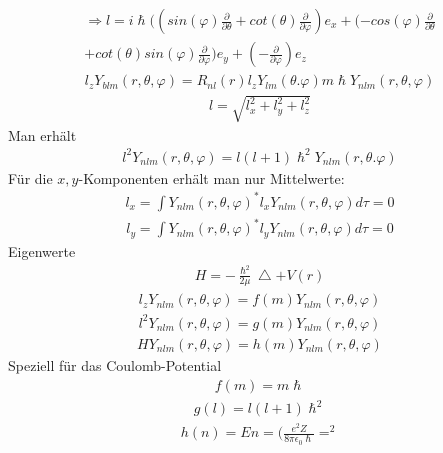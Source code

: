 \documentclass[10pt,a4paper]{article}
\begin{document}
\begin{align}
\Rightarrow l=i\hslash ((sin(\varphi) \frac{\partial}{\partial \theta}+cot(\theta)\frac{\partial}{\partial \varphi})e_x+(-cos(\varphi) \frac{\partial}{\partial \theta} \\ +cot(\theta)sin(\varphi) \frac{\partial}{\partial \varphi})e_y +(-\frac{\partial}{\partial \varphi})e_z
\end{align}
\begin{align}
l_zY_{blm}(r,\theta,\varphi)=R_{nl}(r)l_z Y_{lm}(\theta. \varphi)m \hslash Y_{nlm} (r,\theta,\varphi)
\end{align}
\begin{align}
l=\sqrt{l_x^2+l_y^2+l_z^2}
\end{align}
Man erhält
\begin{align}
l^2 Y_{nlm}(r,\theta,\varphi)=l(l+1) \hslash^2 Y_{nlm}(r,\theta.\varphi)
\end{align}
Für die $x,y$-Komponenten erhält man nur Mittelwerte:
\begin{align}
l_x=\int Y_{nlm}(r,\theta,\varphi)^*l_x Y_{nlm}(r,\theta,\varphi)d\tau=0
\end{align}
\begin{align}
l_y=\int Y_{nlm}(r,\theta,\varphi)^*l_y Y_{nlm}(r,\theta,\varphi)d\tau=0
\end{align}
Eigenwerte
\begin{align}
H=-\frac{\hslash^2}{2 \mu}\bigtriangleup +V(r)
\end{align}
\begin{align}
l_z Y_{nlm}(r,\theta,\varphi)=f(m) Y_{nlm}(r,\theta,\varphi)
\end{align}
\begin{align}
l^2 Y_{nlm}(r,\theta,\varphi)=g(m) Y_{nlm}(r,\theta,\varphi)
\end{align}
\begin{align}
H Y_{nlm}(r,\theta,\varphi)=h(m) Y_{nlm}(r,\theta,\varphi)
\end{align}
Speziell für das Coulomb-Potential
\begin{align}
f(m)=m \hslash
\end{align}
\begin{align}
g(l)=l(l+1)\hslash^2
\end{align}
\begin{align}
h(n)=En=(\frac{e^2Z}{8 \pi \epsilon_0 \hslash}=^2
\end{align}
\end{document}

